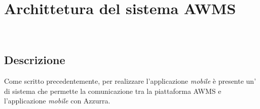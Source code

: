 \chapter{Archittetura del sistema AWMS}
\label{cap:archittettura del sistema AWMS}

\\


\section{Descrizione}
Come scritto precedentemente, per realizzare l'applicazione \emph{mobile} è presente un' di sistema che permette la comunicazione tra la piattaforma \gls{AWMS} e l'applicazione \emph{mobile} con Azzurra.
 
